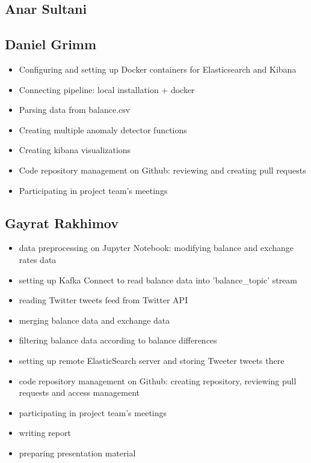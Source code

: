 \documentclass{article}
\begin{document}
\subsection{Anar Sultani}

\subsection{Daniel Grimm}

\begin{itemize}
    \item Configuring and setting up Docker containers for Elasticsearch and Kibana
    \item Connecting pipeline: local installation + docker
    \item Parsing data from balance.csv
    \item Creating multiple anomaly detector functions
    \item Creating kibana visualizations
    \item Code  repository  management  on  Github: reviewing and creating pull requests 
    \item Participating in project team’s meetings
\end{itemize}

\subsection{Gayrat Rakhimov}

\begin{itemize}
    \item data preprocessing on Jupyter Notebook: modifying balance and exchange rates data
    \item setting up Kafka Connect to read balance data into 'balance\_topic' stream
    \item reading Twitter tweets feed from Twitter API
    \item merging balance data and exchange data
    \item filtering balance data according to balance differences
    \item setting up remote ElasticSearch server and storing Tweeter tweets there
    \item code repository management on Github: creating repository, reviewing pull requests and access management
    \item participating in project team's meetings
    \item writing report
    \item preparing presentation material
\end{itemize}
\end{document}
